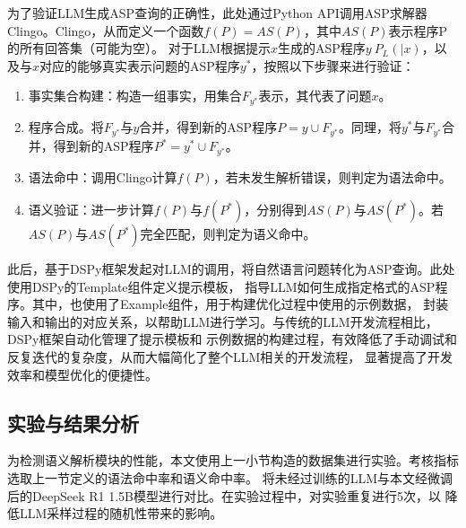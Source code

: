 为了验证LLM生成ASP查询的正确性，此处通过Python API调用ASP求解器Clingo。Clingo，从而定义一个函数$f(P) = AS(P)$，其中$AS(P)$表示程序P的所有回答集（可能为空）。
对于LLM根据提示$x$生成的ASP程序$y ~ P_L(|x)$，以及与$x$对应的能够真实表示问题的ASP程序$y^*$，按照以下步骤来进行验证：
\begin{enumerate}
\item 事实集合构建：构造一组事实，用集合$F_{y^*}$表示，其代表了问题$x$。
\item 程序合成。将$F_{y^*}$与$y$合并，得到新的ASP程序$P = y \cup F_{y^*}$。同理，将$y^*$与$F_{y^*}$合并，得到新的ASP程序$P^* = y^* \cup F_{y^*}$。
\item 语法命中：调用Clingo计算$f(P)$，若未发生解析错误，则判定为语法命中。
\item 语义验证：进一步计算$f(P)$与$f(P^*)$，分别得到$AS(P)$与$AS(P^*)$。若$AS(P)$与$AS(P^*)$完全匹配，则判定为语义命中。
\end{enumerate}

此后，基于DSPy框架发起对LLM的调用，将自然语言问题转化为ASP查询。此处使用DSPy的Template组件定义提示模板，
指导LLM如何生成指定格式的ASP程序。其中，也使用了Example组件，用于构建优化过程中使用的示例数据，
封装输入和输出的对应关系，以帮助LLM进行学习。与传统的LLM开发流程相比，DSPy框架自动化管理了提示模板和
示例数据的构建过程，有效降低了手动调试和反复迭代的复杂度，从而大幅简化了整个LLM相关的开发流程，
显著提高了开发效率和模型优化的便捷性。
\subsection{实验与结果分析}
为检测语义解析模块的性能，本文使用上一小节构造的数据集进行实验。考核指标选取上一节定义的语法命中率和语义命中率。
将未经过训练的LLM与本文经微调后的DeepSeek R1 1.5B模型进行对比。在实验过程中，对实验重复进行5次，以
降低LLM采样过程的随机性带来的影响。

